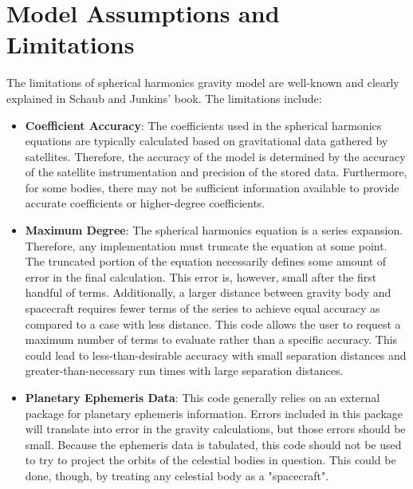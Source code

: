 \section{Model Assumptions and Limitations}
The limitations of spherical harmonics gravity model are well-known and clearly explained in Schaub and Junkins' book\cite{schaub2014}. The limitations include:
\begin{itemize}
	\item \textbf{Coefficient Accuracy}: The coefficients used in the spherical harmonics equations are typically calculated based on gravitational data gathered by satellites. Therefore, the accuracy of the model is determined by the accuracy of the satellite instrumentation and precision of the stored data. Furthermore, for some bodies, there may not be sufficient information available to provide accurate coefficients or higher-degree coefficients.
	\item \textbf{Maximum Degree}: The spherical harmonics equation is a series expansion. Therefore, any implementation must truncate the equation at some point. The truncated portion of the equation necessarily defines some amount of error in the final calculation. This error is, however, small after the first handful of terms. Additionally, a larger distance between gravity body and spacecraft requires fewer terms of the series to achieve equal accuracy as compared to a case with less distance. This code allows the user to request a maximum number of terms to evaluate rather than a specific accuracy. This could lead to less-than-desirable accuracy with small separation distances and greater-than-necessary run times with large separation distances.
	\item \textbf{Planetary Ephemeris Data}: This code generally relies on an external package for planetary ephemeris information. Errors included in this package will translate into error in the gravity calculations, but those errors should be small. Because the ephemeris data is tabulated, this code should not be used to try to project the orbits of the celestial bodies in question. This could be done, though, by treating any celestial body as a "spacecraft".
\end{itemize}